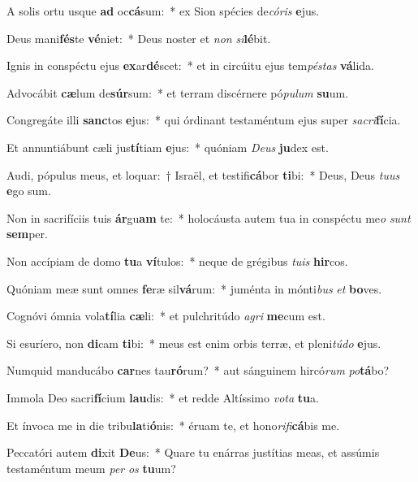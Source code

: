\item A solis ortu usque \textbf{ad} oc\textbf{cá}sum:~* ex Sion spécies de\textit{có}\textit{ris} \textbf{e}jus.
\item Deus mani\textbf{fés}te \textbf{vé}niet:~* Deus noster et \textit{non} \textit{si}\textbf{lé}bit.
\item Ignis in conspéctu ejus \textbf{ex}ar\textbf{dé}scet:~* et in circúitu ejus tem\textit{pés}\textit{tas} \textbf{vá}lida.
\item Advocábit \textbf{cæ}lum de\textbf{súr}sum:~* et terram discérnere pó\textit{pu}\textit{lum} \textbf{su}um.
\item Congregáte illi \textbf{sanc}tos \textbf{e}jus:~* qui órdinant testaméntum ejus super \textit{sa}\textit{cri}\textbf{fí}cia.
\item Et annuntiábunt cæli jus\textbf{tí}tiam \textbf{e}jus:~* quóniam \textit{De}\textit{us} \textbf{ju}dex est.
\item Audi, pópulus meus, et loquar:~† Israël, et testifi\textbf{cá}bor \textbf{ti}bi:~* Deus, Deus \textit{tu}\textit{us} \textbf{e}go sum.
\item Non in sacrifíciis tuis \textbf{ár}gu\textbf{am} te:~* holocáusta autem tua in conspéctu me\textit{o} \textit{sunt} \textbf{sem}per.
\item Non accípiam de domo \textbf{tu}a \textbf{ví}tulos:~* neque de grégibus \textit{tu}\textit{is} \textbf{hir}cos.
\item Quóniam meæ sunt omnes \textbf{fe}ræ sil\textbf{vá}rum:~* juménta in mónti\textit{bus} \textit{et} \textbf{bo}ves.
\item Cognóvi ómnia vola\textbf{tí}lia \textbf{cæ}li:~* et pulchritúdo \textit{a}\textit{gri} \textbf{me}cum est.
\item Si esuríero, non \textbf{di}cam \textbf{ti}bi:~* meus est enim orbis terræ, et pleni\textit{tú}\textit{do} \textbf{e}jus.
\item Numquid manducábo \textbf{car}nes tau\textbf{ró}rum?~* aut sánguinem hircó\textit{rum} \textit{po}\textbf{tá}bo?
\item Immola Deo sacri\textbf{fí}cium \textbf{lau}dis:~* et redde Altíssimo \textit{vo}\textit{ta} \textbf{tu}a.
\item Et ínvoca me in die tribu\textbf{la}ti\textbf{ó}nis:~* éruam te, et hono\textit{ri}\textit{fi}\textbf{cá}bis me.
\item Peccatóri autem \textbf{di}xit \textbf{De}us:~* Quare tu enárras justítias meas, et assúmis testaméntum meum \textit{per} \textit{os} \textbf{tu}um?
